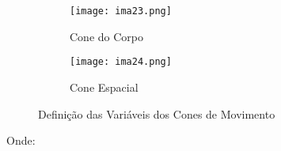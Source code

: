 \documentclass{article}
\begin{document}
                \begin{figure}[H]
                    \centering
                    \begin{subfigure}[t]{0.45\textwidth}
                        \centering
                        \texttt{[image: ima23.png]}
                        \caption{Cone do Corpo}
                    \end{subfigure}
                    \begin{subfigure}[t]{0.45\textwidth}
                        \centering
                        \texttt{[image: ima24.png]}
                        \caption{Cone Espacial}
                    \end{subfigure}
                    \caption{Definição das Variáveis dos Cones de Movimento}
                \end{figure}\noindent
            Onde:
\end{document}
